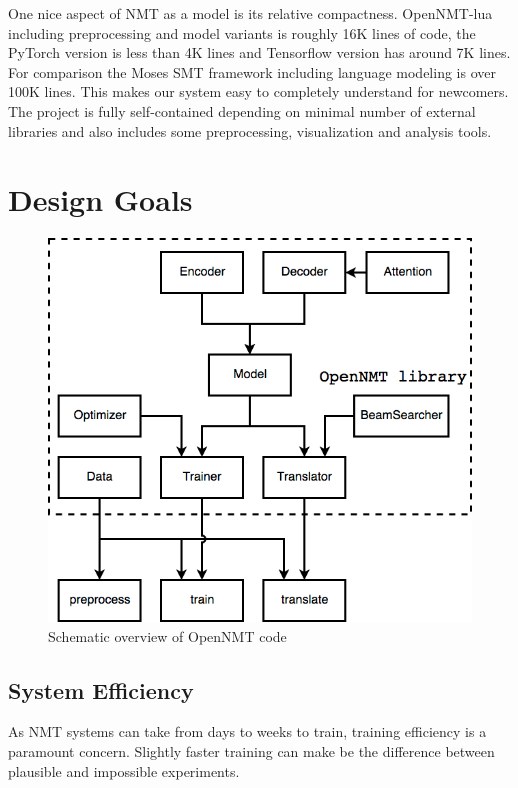 \documentclass[]{article}
\begin{document}
One nice aspect of NMT as a model is its relative compactness.
OpenNMT-lua including preprocessing and model variants is roughly 16K lines of code,
the PyTorch version is less than 4K lines and Tensorflow version has around 7K lines. For comparison the Moses SMT framework
including language modeling is over 100K lines. This makes our system
easy to completely understand for newcomers. The project is fully
self-contained depending on minimal number of external libraries
and also includes some preprocessing, visualization and analysis tools.


\section{Design Goals}
\begin{figure}[t]
        \centering
        \includegraphics[scale=0.36]{OpenNMTDiagram.png}
        \caption{\label{fig:codestruct}Schematic overview of OpenNMT code}
    \end{figure}
\subsection{System Efficiency}

As NMT systems can take from days to weeks to train, training
efficiency is a paramount concern. Slightly faster training can make be the difference between
plausible and impossible experiments.
\end{document}
